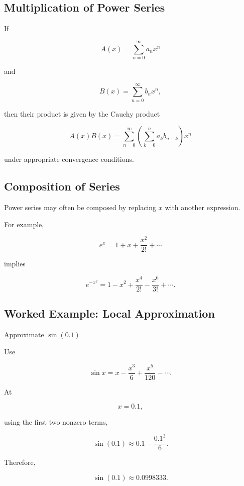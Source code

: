 \subsection{Multiplication of Power Series}
\label{subsec:multiply-power-series-reference}

If

\[
A(x)
=
\sum_{n=0}^{\infty}a_nx^n
\]

and

\[
B(x)
=
\sum_{n=0}^{\infty}b_nx^n,
\]

then their product is given by the Cauchy product

\[
\boxed{
A(x)B(x)
=
\sum_{n=0}^{\infty}
\left(
\sum_{k=0}^{n}
a_kb_{n-k}
\right)
x^n
}
\]

under appropriate convergence conditions.

\subsection{Composition of Series}
\label{subsec:composition-series-reference}

Power series may often be composed by replacing \(x\) with another expression.

For example,

\[
e^x
=
1+x+\frac{x^2}{2!}+\cdots
\]

implies

\[
\boxed{
e^{-x^2}
=
1
-
x^2
+
\frac{x^4}{2!}
-
\frac{x^6}{3!}
+\cdots.
}
\]

\subsection{Worked Example: Local Approximation}
\label{subsec:worked-local-series-approximation}

\begin{workedexamplebox}{Approximate \(\sin(0.1)\)}

Use

\[
\sin x
=
x-\frac{x^3}{6}
+\frac{x^5}{120}
-\cdots.
\]

At

\[
x=0.1,
\]

using the first two nonzero terms,

\[
\sin(0.1)
\approx
0.1
-
\frac{0.1^3}{6}.
\]

Therefore,

\begin{answerbox}
\[
\boxed{
\sin(0.1)
\approx
0.0998333.
}
\]
\end{answerbox}

\end{workedexamplebox}

